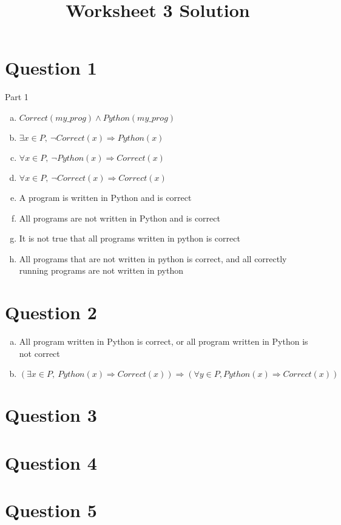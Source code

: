 \documentclass[12pt]{article}
\begin{document}
\title{Worksheet 3 Solution}
\maketitle

\section*{Question 1}

Part 1
\begin{enumerate}[a)]
    \item
        $Correct(my\_prog) \land Python(my\_prog)$
    \item
        $\exists x \in P,\: \neg Correct(x) \Rightarrow Python(x)$
    \item
        $\forall x \in P,\: \neg Python(x) \Rightarrow Correct(x)$
    \item
        $\forall x \in P,\: \neg Correct(x) \Rightarrow Correct(x)$
    \item
        A program is written in Python and is correct
    \item
        All programs are not written in Python and is correct
    \item
        It is not true that all programs written in python is correct
    \item
        All programs that are not written in python is correct, and all correctly running programs are not written in python

\end{enumerate}

\section*{Question 2}

\begin{enumerate}[a)]
    \item
        All program written in Python is correct, or all program written in Python is not correct
    \item
        $(\exists x \in P,\: Python(x) \Rightarrow Correct(x)) \Rightarrow (\forall y \in P, Python(x) \Rightarrow Correct(x))$
\end{enumerate}


\section*{Question 3}

\section*{Question 4}

\section*{Question 5}
\end{document}
